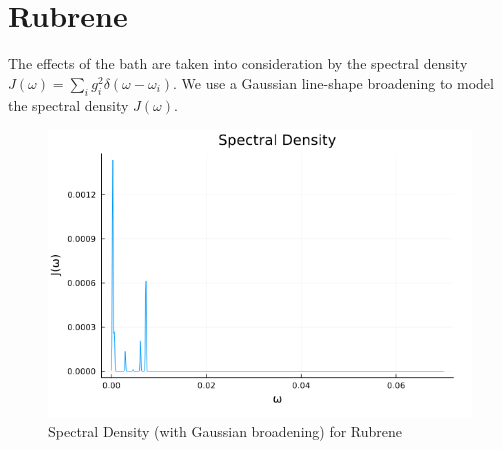 \section{Rubrene}





The effects of the bath are taken into consideration by the spectral density $J(\omega) = \sum_{i} g_i ^{2} \delta(\omega - \omega_i)$. We use a Gaussian line-shape broadening to model the spectral density $J(\omega)$.


\begin{figure}
    \centering
    \includegraphics[scale=0.4]{Figures/jw_rubrene.png}
    \caption{Spectral Density (with Gaussian broadening) for Rubrene}
\end{figure}

